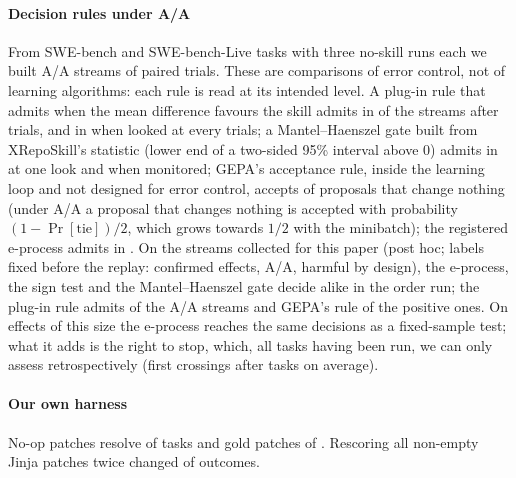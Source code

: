 \documentclass[sigconf,review,anonymous]{acmart}
\begin{document}
\paragraph{Decision rules under A/A}
From \naaTasks{} SWE-bench and SWE-bench-Live tasks with three no-skill runs each we built \naaStreams{} A/A streams of
\naaTrials{} paired trials. These are comparisons of error control, not of learning algorithms:
each rule is read at its intended level. A plug-in rule that admits when the mean difference
favours the skill admits in \npluginOnce{} of the streams after \naaTrials{} trials, and in
\npluginMonitored{} when looked at every \naaLook{} trials; a Mantel--Haenszel gate built from
XRepoSkill's statistic (lower end of a two-sided 95\% interval above 0) admits in \nbxOnce{} at one
look and \nbxMonitored{} when monitored; GEPA's acceptance rule, inside the learning loop and not
designed for error control, accepts \ngepaNoop{} of proposals that change nothing (under A/A a
proposal that changes nothing is accepted with probability $(1-\Pr[\text{tie}])/2$, which grows
towards $1/2$ with the minibatch); the registered e-process admits in \ngkAdmitAA{}. On the
\nrulesStreams{} streams collected for this paper (post hoc; labels fixed before the replay:
\nrulesPos{} confirmed effects, \nrulesNull{} A/A, \nrulesHarm{} harmful by design), the
e-process, the sign test and the Mantel--Haenszel gate decide alike in the order run; the plug-in
rule admits \nrulesPluginNull{} of the A/A streams and GEPA's rule \nrulesGepaPos{} of the
\nrulesPos{} positive ones. On effects of this size the e-process reaches the same decisions as a
fixed-sample test; what it adds is the right to stop, which, all tasks having been run, we can only
assess retrospectively (first crossings after \nadmitMeanTrials{} tasks on average).

\paragraph{Our own harness}
No-op patches resolve \nnoopOurs{} of \nnoopOursN{} tasks and gold patches \ngoldOursOk{} of
\ngoldOursN{}. Rescoring all \nrsPatches{} non-empty Jinja patches twice changed \nrsFlips{} of
\nrsScorings{} outcomes.
\end{document}
